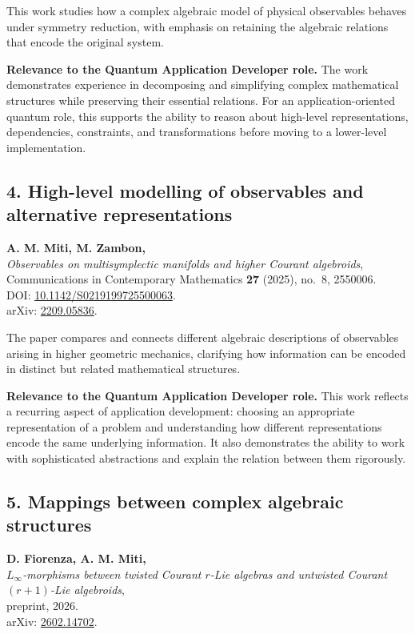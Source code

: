 \documentclass[10pt,a4paper]{article}
\newcommand{\relevance}[1]{\textbf{Relevance to the Quantum Application Developer role.} #1}
\begin{document}
This work studies how a complex algebraic model of physical observables behaves under symmetry reduction, with emphasis
on retaining the algebraic relations that encode the original system.

\relevance{The work demonstrates experience in decomposing and simplifying complex mathematical structures while
preserving their essential relations. For an application-oriented quantum role, this supports the ability to reason about
high-level representations, dependencies, constraints, and transformations before moving to a lower-level implementation.}

\subsection*{4. High-level modelling of observables and alternative representations}

\textbf{A. M. Miti, M. Zambon,}\\
\textit{Observables on multisymplectic manifolds and higher Courant algebroids},\\
Communications in Contemporary Mathematics \textbf{27} (2025), no.~8, 2550006.\\
DOI: \href{https://doi.org/10.1142/S0219199725500063}{10.1142/S0219199725500063}.\\
arXiv: \href{https://arxiv.org/abs/2209.05836}{2209.05836}.

The paper compares and connects different algebraic descriptions of observables arising in higher geometric mechanics,
clarifying how information can be encoded in distinct but related mathematical structures.

\relevance{This work reflects a recurring aspect of application development: choosing an appropriate representation of
a problem and understanding how different representations encode the same underlying information. It also demonstrates
the ability to work with sophisticated abstractions and explain the relation between them rigorously.}

\subsection*{5. Mappings between complex algebraic structures}

\textbf{D. Fiorenza, A. M. Miti,}\\
\textit{$L_\infty$-morphisms between twisted Courant $r$-Lie algebras and untwisted Courant $(r+1)$-Lie algebroids},\\
preprint, 2026.\\
arXiv: \href{https://arxiv.org/abs/2602.14702}{2602.14702}.
\end{document}
